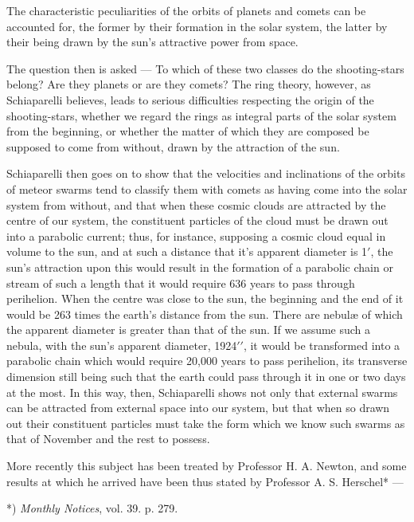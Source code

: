 \documentclass[a4paper, 12pt, oneside, polutonikogreek, english]{article}
\begin{document}
The characteristic peculiarities of the orbits of planets and comets can be accounted for, the former by their formation in the solar system, the latter by their being drawn by the sun's attractive power from space.

The question then is asked --- To which of these two classes do the shooting-stars belong? Are they planets or are they comets? The ring theory, however, as Schiaparelli believes, leads to serious difficulties respecting the origin of the shooting-stars, whether we regard the rings as integral parts of the solar system from the beginning, or whether the matter of which they are composed be supposed to come from without, drawn by the attraction of the sun.

Schiaparelli then goes on to show that the velocities and inclinations of the orbits of meteor swarms tend to classify them with comets as having come into the solar system from without, and that when these cosmic clouds are attracted by the centre of our system, the constituent particles of the cloud must be drawn out into a parabolic current; thus, for instance, supposing a cosmic cloud equal in volume to the sun, and at such a distance that it's apparent diameter is 1$\prime$, the sun's attraction upon this would result in the formation of a parabolic chain or stream of such a length that it would require 636 years to pass through perihelion. When the centre was close to the sun, the beginning and the end of it would be 263 times the earth's distance from the sun. There are nebulæ of which the apparent diameter is greater than that of the sun. If we assume such a nebula, with the sun's apparent diameter, 1924$\prime\prime$, it would be transformed into a parabolic chain which would require 20,000 years to pass perihelion, its transverse dimension still being such that the earth could pass through it in one or two days at the most. In this way, then, Schiaparelli shows not only that external swarms can be attracted from external space into our system, but that when so drawn out their constituent particles must take the form which we know such swarms as that of November and the rest to possess.

More recently this subject has been treated by Professor H. A. Newton, and some results at which he arrived have been thus stated by Professor A. S. Herschel* ---

*) \emph{Monthly Notices}, vol. 39. p. 279.
\end{document}
